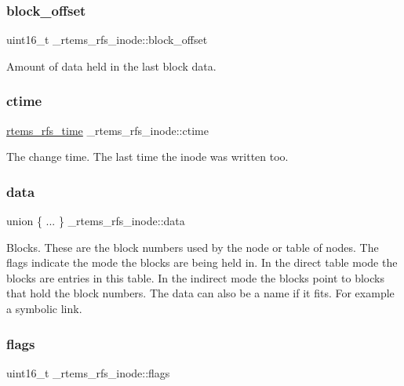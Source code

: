 \subsubsection{\texorpdfstring{block\_offset}{block\_offset}}
{\footnotesize\ttfamily uint16\+\_\+t \+\_\+rtems\+\_\+rfs\+\_\+inode\+::block\+\_\+offset}

Amount of data held in the last block data. \mbox{\label{struct__rtems__rfs__inode_ab9d5b56f4b8db425fb20d31815c12008}} 
\subsubsection{\texorpdfstring{ctime}{ctime}}
{\footnotesize\ttfamily \mbox{\hyperlink{rtems-rfs-inode_8h_a7877cc60240d76cccb89acaffdd20aa6}{rtems\+\_\+rfs\+\_\+time}} \+\_\+rtems\+\_\+rfs\+\_\+inode\+::ctime}

The change time. The last time the inode was written too. \mbox{\label{struct__rtems__rfs__inode_ac15acee2452f036f667e6e21dff97a99}} 
\subsubsection{\texorpdfstring{data}{data}}
{\footnotesize\ttfamily union \{ ... \}   \+\_\+rtems\+\_\+rfs\+\_\+inode\+::data}

Blocks. These are the block numbers used by the node or table of nodes. The flags indicate the mode the blocks are being held in. In the direct table mode the blocks are entries in this table. In the indirect mode the blocks point to blocks that hold the block numbers. The data can also be a name if it fits. For example a symbolic link. \mbox{\label{struct__rtems__rfs__inode_a89cb2af02b004971b6ae2fed03c32a33}} 
\subsubsection{\texorpdfstring{flags}{flags}}
{\footnotesize\ttfamily uint16\+\_\+t \+\_\+rtems\+\_\+rfs\+\_\+inode\+::flags}

